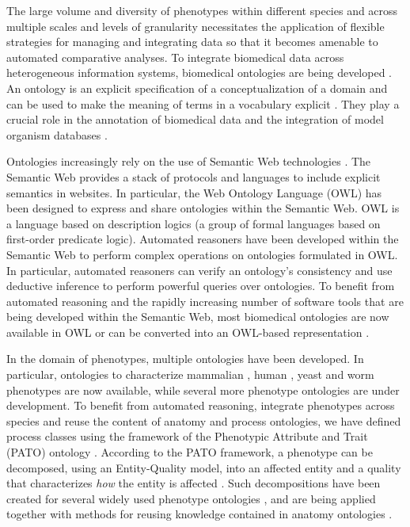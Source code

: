 \documentclass{bioinfo}
\renewcommand{\cite}{\citep}
\begin{document}
The large volume and diversity of phenotypes within different species
and across multiple scales and levels of granularity necessitates the
application of flexible strategies for managing and integrating data
so that it becomes amenable to automated comparative analyses. To
integrate biomedical data across heterogeneous information systems,
biomedical ontologies are being developed \cite{Smith2007short}. An
ontology is an explicit specification of a conceptualization of a
domain and can be used to make the meaning of terms in a vocabulary
explicit \cite{Gruber1995, Guarino1998}. They play a crucial role in
the annotation of biomedical data and the integration of model
organism databases \cite{go2010, Bada2004, goble}.

Ontologies increasingly rely on the use of Semantic Web technologies
\cite{Berners-Lee2001}. The Semantic Web provides a stack of protocols
and languages to include explicit semantics in websites. In
particular, the Web Ontology Language (OWL) \cite{Grau2008} has been
designed to express and share ontologies within the Semantic Web. OWL
is a language based on description logics (a group of formal languages
based on first-order predicate logic). Automated reasoners have been
developed within the Semantic Web to perform complex operations on
ontologies formulated in OWL. In particular, automated reasoners can
verify an ontology's consistency and use deductive inference to
perform powerful queries over ontologies. To benefit from automated
reasoning and the rapidly increasing number of software tools that are
being developed within the Semantic Web, most biomedical ontologies
are now available in OWL or can be converted into an OWL-based
representation \cite{Horrocks2007, Hoehndorf2010patterns}.

In the domain of phenotypes, multiple ontologies have been
developed. In particular, ontologies to characterize mammalian
\cite{Smith2004}, human \cite{Robinson2008}, yeast \cite{aposhort} and
worm \cite{wpo} phenotypes are now available, while several more
phenotype ontologies are under development. To benefit from automated
reasoning, integrate phenotypes across species and reuse the content
of anatomy and process ontologies, we have defined process classes
using the framework of the Phenotypic Attribute and Trait (PATO)
ontology \cite{Gkoutos2005}. According to the PATO framework, a
phenotype can be decomposed, using an Entity-Quality model, into an
affected entity and a quality that characterizes {\em how} the entity
is affected \cite{Gkoutos2005}. Such decompositions have been created
for several widely used phenotype ontologies \cite{Mungall2010,
  Gkoutos2009b, obml2011h1}, and are being applied together with
methods for reusing knowledge contained in anatomy ontologies
\cite{Mungall2010, Hoehndorf2010phene}.
\end{document}
